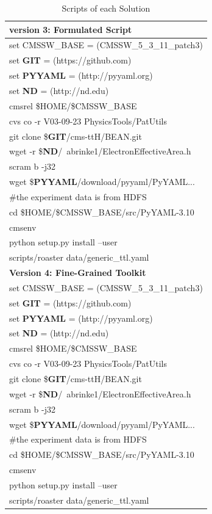 \documentclass{acm_proc_article-sp}
\begin{document}
\begin{table}
\begin{tabular}{|l|}
        \hline
        {\bf version 3: Formulated Script} \\ \hline
        set CMSSW\_BASE = (CMSSW\_5\_3\_11\_patch3) \\
        set {\bf GIT} = (https://github.com) \\
        set {\bf PYYAML} = (http://pyyaml.org) \\
        set {\bf ND} = (http://nd.edu) \\
        cmsrel \$HOME/\$CMSSW\_BASE \\
        cvs co -r V03-09-23 PhysicsTools/PatUtils \\
        git clone \${\bf GIT}/cms-ttH/BEAN.git \\
        wget -r \${\bf ND}/~abrinke1/ElectronEffectiveArea.h \\
        scram b -j32 \\
        wget \${\bf PYYAML}/download/pyyaml/PyYAML...\\
        \#the experiment data is from HDFS \\
        cd \$HOME/\$CMSSW\_BASE/src/PyYAML-3.10\\
        cmsenv\\
        python setup.py install --user \\
        scripts/roaster data/generic\_ttl.yaml \\ 
        \hline
        {\bf Version 4: Fine-Grained Toolkit}\\ \hline
        set CMSSW\_BASE = (CMSSW\_5\_3\_11\_patch3) \\
        set {\bf GIT} = (https://github.com) \\
        set {\bf PYYAML} = (http://pyyaml.org) \\
        set {\bf ND} = (http://nd.edu) \\
        cmsrel \$HOME/\$CMSSW\_BASE \\
        cvs co -r V03-09-23 PhysicsTools/PatUtils \\
        git clone \${\bf GIT}/cms-ttH/BEAN.git \\
        wget -r \${\bf ND}/~abrinke1/ElectronEffectiveArea.h \\
        scram b -j32 \\
        wget \${\bf PYYAML}/download/pyyaml/PyYAML...\\
        \#the experiment data is from HDFS \\
        cd \$HOME/\$CMSSW\_BASE/src/PyYAML-3.10\\ 
        cmsenv\\
        python setup.py install --user \\
        scripts/roaster data/generic\_ttl.yaml \\
        \hline
    \end{tabular}
    \caption{Scripts of each Solution}
    \label{table:scripts}
\end{table}
\end{document}
